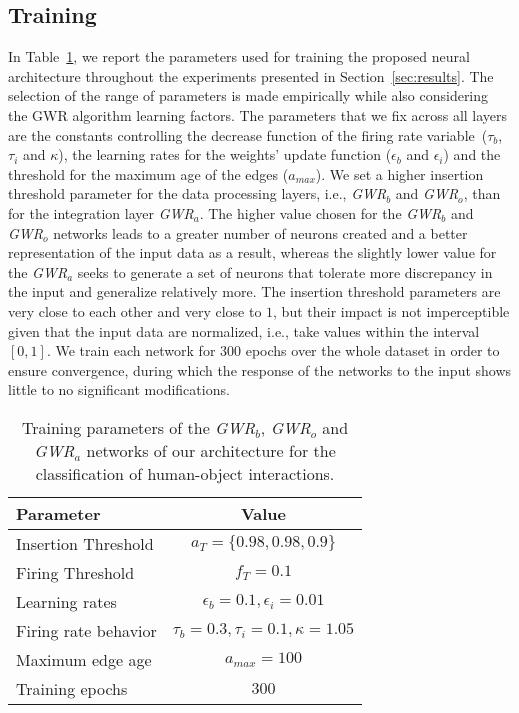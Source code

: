 \documentclass[5p,times]{elsarticle}
\begin{document}
\subsection{Training}\label{subsec:training}
In Table~\ref{table:parameters}, we report the parameters used for training the proposed neural architecture throughout the experiments presented in Section~\ref{sec:results}.
The selection of the range of parameters is made empirically
while also considering the GWR algorithm learning factors.
The parameters that we fix across all layers are the constants controlling the decrease function of the firing rate variable~($\tau_b$, $\tau_i$ and $\kappa$), the learning rates for the weights' update function ($\epsilon_b$ and $\epsilon_i$) and the threshold for the maximum age of the edges ($a_{max}$).
We set a higher insertion threshold parameter for the data processing layers, i.e., \textit{GWR}$_b$ and \textit{GWR}$_o$, than for the integration layer \textit{GWR}$_a$.
The higher value chosen for the \textit{GWR}$_b$ and \textit{GWR}$_o$ networks leads to a greater number of neurons created and a better representation of the input data as a result, whereas the slightly lower value for the \textit{GWR}$_a$ seeks to generate a set of neurons that tolerate more discrepancy in the input and generalize relatively more.
The insertion threshold parameters are very close to each other and very close to $1$, but their impact is not imperceptible given that the input data are normalized, i.e., take values within the interval $[0, 1]$.
We train each network for 300 epochs over the whole dataset in order to ensure convergence, during which the response of the networks to the input shows little to no significant modifications. 

\begin{table}
\caption{Training parameters of the \textit{GWR}$_b$, \textit{GWR}$_o$ and \textit{GWR}$_a$ networks of our architecture for the classification of human-object interactions.}
\label{table:parameters}
\footnotesize
\begin{center}
\begin{tabular}{l|c} 
Parameter & Value \\
\hline
Insertion Threshold & $a_T = \{0.98, 0.98, 0.9\}$\\
Firing Threshold & $f_T = 0.1$\\
Learning rates & $\epsilon_b = 0.1, \epsilon_i = 0.01$\\
Firing rate behavior & $\tau_b=0.3, \tau_i = 0.1,  \kappa = 1.05$\\
Maximum edge age &  $a_{max} = 100$\\
Training epochs & $300$ \\
\hline
\end{tabular}
\end{center}
\end{table}
\end{document}
